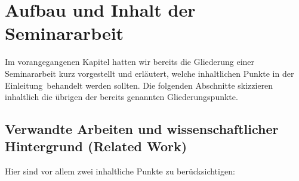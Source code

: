 %
\section{Aufbau und Inhalt der Seminararbeit}
\label{sec_aufbau}

Im vorangegangenen Kapitel hatten wir bereits die Gliederung einer Seminararbeit kurz vorgestellt und erläutert, welche inhaltlichen Punkte in der \glqq Einleitung\grqq\, behandelt werden sollten.
Die folgenden Abschnitte skizzieren inhaltlich die übrigen der bereits genannten Gliederungspunkte.

\subsection{Verwandte Arbeiten und wissenschaftlicher Hintergrund (Related Work)}
Hier sind vor allem zwei inhaltliche Punkte zu berücksichtigen:
